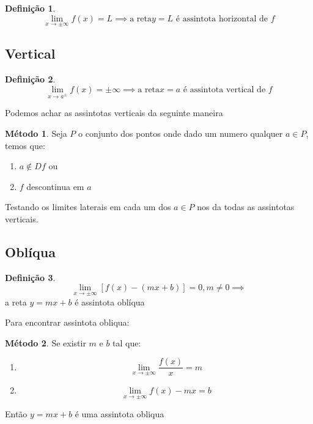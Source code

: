 \documentclass[14pt]{extreport}
\theoremstyle{definition}
\newtheorem{definition}{Definição}
\newtheorem{method}{Método}
\begin{document}
\begin{definition}
    \begin{equation}
        \lim_{x \to \pm \infty} f(x) = L \implies \text{a reta} y = L \text{ é assintota horizontal de \(f\)}
    \end{equation}
\end{definition}

\subsection{Vertical}

\begin{definition}
    \begin{equation}
        \lim_{x \to a^{\pm}} f(x) = \pm \infty \implies \text{a reta} x = a \text{ é assintota vertical de \(f\)}
    \end{equation}
\end{definition}
Podemos achar as assintotas verticais da seguinte maneira
\begin{method}
    Seja \(P\) o conjunto dos pontos onde dado um numero qualquer \( a \in P\), temos que:
    \begin{enumerate}
        \item \(a \notin Df\) ou
        \item \(f\) descontinua em \(a\)
    \end{enumerate}
    Testando os limites laterais em cada um dos \( a \in P\) nos da todas as assintotas verticais.
\end{method}

\subsection{Oblíqua}

\begin{definition}
    \begin{equation}
        \lim_{x \to \pm \infty} [f(x) - (mx + b)] = 0, m \neq 0 \implies 
    \end{equation}
    \centering
    a reta \( y = mx + b\) é assintota oblíqua
\end{definition}
Para encontrar assintota obliqua:
\begin{method}
    Se existir \(m\) e \(b\) tal que:
    \begin{enumerate}
        \item 
            \begin{equation}
                \lim_{x \to \pm \infty}  \frac{f(x)}{x} = m
            \end{equation}
        \item
            \begin{equation}
                \lim_{x \to \pm \infty}  f(x) - mx = b
            \end{equation}
    \end{enumerate}
    Então
    \(y = mx + b\) é uma assintota obliqua
\end{method}
\end{document}
